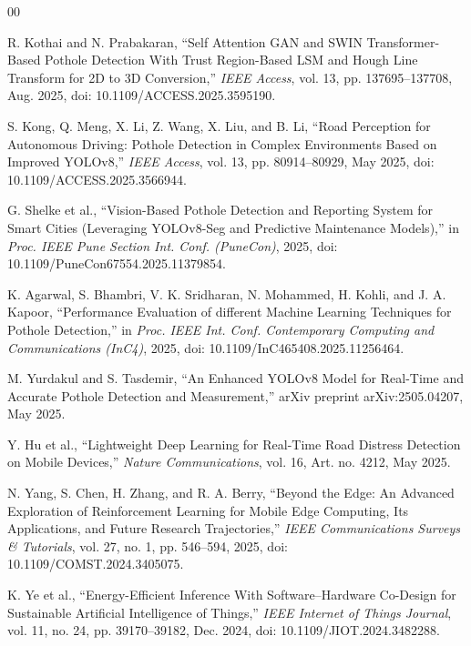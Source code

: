 \documentclass{ieeeaccess}
\begin{document}
\begin{thebibliography}{00}


R. Kothai and N. Prabakaran,
``Self Attention GAN and SWIN Transformer-Based Pothole Detection With Trust Region-Based LSM and Hough Line Transform for 2D to 3D Conversion,''
\textit{IEEE Access}, vol. 13, pp. 137695--137708, Aug. 2025,
doi: 10.1109/ACCESS.2025.3595190.

S. Kong, Q. Meng, X. Li, Z. Wang, X. Liu, and B. Li,
``Road Perception for Autonomous Driving: Pothole Detection in Complex Environments Based on Improved YOLOv8,''
\textit{IEEE Access}, vol. 13, pp. 80914--80929, May 2025,
doi: 10.1109/ACCESS.2025.3566944.

G. Shelke et al.,
``Vision-Based Pothole Detection and Reporting System for Smart Cities (Leveraging YOLOv8-Seg and Predictive Maintenance Models),''
in \textit{Proc. IEEE Pune Section Int. Conf. (PuneCon)}, 2025,
doi: 10.1109/PuneCon67554.2025.11379854.

K. Agarwal, S. Bhambri, V. K. Sridharan, N. Mohammed, H. Kohli, and J. A. Kapoor,
``Performance Evaluation of different Machine Learning Techniques for Pothole Detection,''
in \textit{Proc. IEEE Int. Conf. Contemporary Computing and Communications (InC4)}, 2025,
doi: 10.1109/InC465408.2025.11256464.

M. Yurdakul and S. Tasdemir,
``An Enhanced YOLOv8 Model for Real-Time and Accurate Pothole Detection and Measurement,''
arXiv preprint arXiv:2505.04207, May 2025.

Y. Hu et al.,
``Lightweight Deep Learning for Real-Time Road Distress Detection on Mobile Devices,''
\textit{Nature Communications}, vol. 16, Art. no. 4212, May 2025.

N. Yang, S. Chen, H. Zhang, and R. A. Berry,
``Beyond the Edge: An Advanced Exploration of Reinforcement Learning for Mobile Edge Computing, Its Applications, and Future Research Trajectories,''
\textit{IEEE Communications Surveys \& Tutorials}, vol. 27, no. 1, pp. 546--594, 2025,
doi: 10.1109/COMST.2024.3405075.


K. Ye et al.,
``Energy-Efficient Inference With Software--Hardware Co-Design for Sustainable Artificial Intelligence of Things,''
\textit{IEEE Internet of Things Journal}, vol. 11, no. 24, pp. 39170--39182, Dec. 2024,
doi: 10.1109/JIOT.2024.3482288.


\end{thebibliography}
\end{document}
